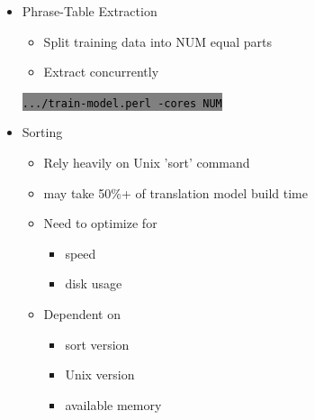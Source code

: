 \documentclass[landscape]{uedslides2C}
\newcommand{\littlecode}[1]{\colorbox{gray}{\textcolor{black}{\small \tt #1}}}
\begin{document}

\vspace{30mm}
\begin{itemize} \itemsep -1mm

\item {Phrase-Table Extraction}
  \begin{itemize}
  \item Split training data into NUM equal parts
  \item Extract concurrently
  \end{itemize}
  \begin{center}
    \littlecode{.../train-model.perl -cores NUM}
  \end{center}      
\end{itemize}


\vspace{10mm}
\begin{itemize} \itemsep -1mm
\item {Sorting}
  \begin{itemize}
  \item Rely heavily on Unix 'sort' command
    \item may take 50\%+ of translation model build time 
  \item Need to optimize for
     \begin{itemize}
      \item speed
      \item disk usage
     \end{itemize}

  \item Dependent on
    \begin{itemize}
    \item      sort version
    \item      Unix version
    \item      available memory
    \end{itemize}
  \end{itemize}
\end{itemize}

\end{document}
